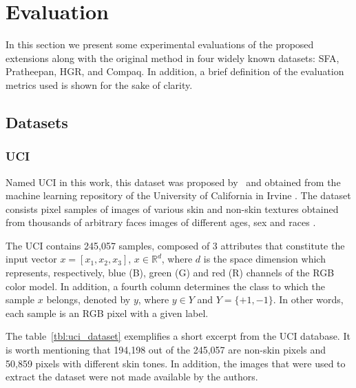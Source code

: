 \chapter{Evaluation}
\label{cap:experimentos}

In this section we present some experimental evaluations of the proposed extensions along with the original method in four widely known datasets: SFA, Pratheepan, HGR, and Compaq. In addition, a brief definition of the evaluation metrics used is shown for the sake of clarity.


\section{Datasets}
\label{sec:datasets}

\subsection{UCI}
\label{sec:datasets_uci}
Named UCI in this work, this dataset was proposed by~\citet{uci-skin-dataset:12} and obtained from the machine learning repository of the University of California in Irvine \citep{lichman:13}. The dataset consists pixel samples of images of various skin and non-skin textures obtained from thousands of arbitrary faces images of different ages, sex and races \citep{pal-texas:04, feret:96}.

The UCI contains 245,057 samples, composed of 3 attributes that constitute the input vector $x = [x_1, x_2, x_3]$, $x \in \mathbb{R}^{d}$, where $d$ is the space dimension which represents, respectively, blue (B), green (G) and red (R) channels of the RGB color model. In addition, a fourth column determines the class to which the sample $x$ belongs, denoted by $y$, where $y \in Y$ and $Y = \{+1, -1\}$. In other words, each sample is an RGB pixel with a given label.

The table~\ref{tbl:uci_dataset} exemplifies a short excerpt from the UCI database. It is worth mentioning that 194,198 out of the 245,057 are non-skin pixels and 50,859 pixels with different skin tones. In addition, the images that were used to extract the dataset were not made available by the authors.

